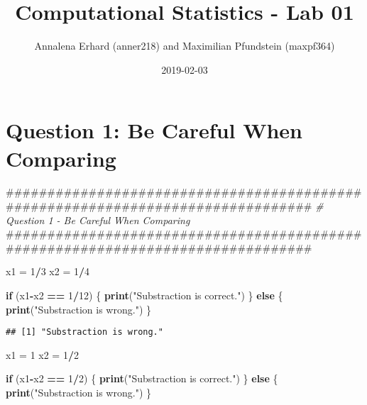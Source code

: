 \documentclass[]{article}
\title{Computational Statistics - Lab 01}
\author{Annalena Erhard (anner218) and Maximilian Pfundstein (maxpf364)}
\date{2019-02-03}
\newenvironment{Shaded}{\begin{snugshade}}{\end{snugshade}}
\newcommand{\KeywordTok}[1]{\textcolor[rgb]{0.13,0.29,0.53}{\textbf{#1}}}
\newcommand{\DecValTok}[1]{\textcolor[rgb]{0.00,0.00,0.81}{#1}}
\newcommand{\StringTok}[1]{\textcolor[rgb]{0.31,0.60,0.02}{#1}}
\newcommand{\CommentTok}[1]{\textcolor[rgb]{0.56,0.35,0.01}{\textit{#1}}}
\newcommand{\ControlFlowTok}[1]{\textcolor[rgb]{0.13,0.29,0.53}{\textbf{#1}}}
\newcommand{\OperatorTok}[1]{\textcolor[rgb]{0.81,0.36,0.00}{\textbf{#1}}}
\newcommand{\NormalTok}[1]{#1}
\begin{document}
\maketitle

{
\setcounter{tocdepth}{3}
\tableofcontents
}
\section{Question 1: Be Careful When
Comparing}\label{question-1-be-careful-when-comparing}

\begin{Shaded}
\begin{Highlighting}[]
\NormalTok{################################################################################}
\CommentTok{# Question 1 - Be Careful When Comparing}
\NormalTok{################################################################################}

\NormalTok{x1 =}\StringTok{ }\DecValTok{1}\OperatorTok{/}\DecValTok{3}
\NormalTok{x2 =}\StringTok{ }\DecValTok{1}\OperatorTok{/}\DecValTok{4}

\ControlFlowTok{if}\NormalTok{ (x1}\OperatorTok{-}\NormalTok{x2 }\OperatorTok{==}\StringTok{ }\DecValTok{1}\OperatorTok{/}\DecValTok{12}\NormalTok{) \{}
  \KeywordTok{print}\NormalTok{(}\StringTok{"Substraction is correct."}\NormalTok{)}
\NormalTok{\} }\ControlFlowTok{else}\NormalTok{ \{}
  \KeywordTok{print}\NormalTok{(}\StringTok{"Substraction is wrong."}\NormalTok{)}
\NormalTok{\}}
\end{Highlighting}
\end{Shaded}

\begin{verbatim}
## [1] "Substraction is wrong."
\end{verbatim}

\begin{Shaded}
\begin{Highlighting}[]
\NormalTok{x1 =}\StringTok{ }\DecValTok{1}
\NormalTok{x2 =}\StringTok{ }\DecValTok{1}\OperatorTok{/}\DecValTok{2}

\ControlFlowTok{if}\NormalTok{ (x1}\OperatorTok{-}\NormalTok{x2 }\OperatorTok{==}\StringTok{ }\DecValTok{1}\OperatorTok{/}\DecValTok{2}\NormalTok{) \{}
  \KeywordTok{print}\NormalTok{(}\StringTok{"Substraction is correct."}\NormalTok{)}
\NormalTok{\} }\ControlFlowTok{else}\NormalTok{ \{}
  \KeywordTok{print}\NormalTok{(}\StringTok{"Substraction is wrong."}\NormalTok{)}
\NormalTok{\}}
\end{Highlighting}
\end{Shaded}
\end{document}
